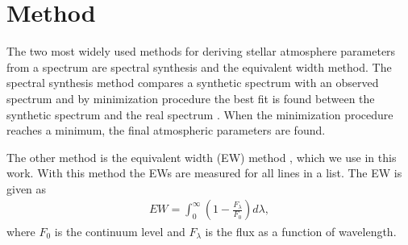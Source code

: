 \documentclass{aa}
\begin{document}






\section{Method}
\label{sec:method}

The two most widely used methods for deriving stellar atmosphere
parameters from a spectrum are spectral synthesis and the equivalent
width method. The spectral synthesis method compares a synthetic
spectrum with an observed spectrum and by minimization procedure the
best fit is found between the synthetic spectrum and the real spectrum
\citep[see e.g.][]{Valenti2005,Onehag2012}. When the minimization
procedure reaches a minimum, the final atmospheric parameters are found.

The other method is the equivalent width (EW) method \citep{Sousa2008a},
which we use in this work. With this method the EWs are measured for all
lines in a list. The EW is given as
\begin{align}
    \label{eq:EW}
    EW = \int_0^\infty \left(1 - \frac{F_\lambda}{F_0}\right) d\lambda,
\end{align}
where $F_0$ is the continuum level and $F_\lambda$ is the flux as a
function of wavelength.
\end{document}
